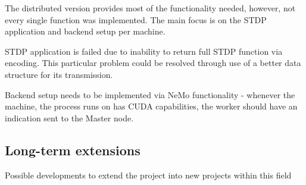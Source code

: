 The distributed version provides most of the functionality needed, however, not every single function was implemented. The main focus is on the STDP application and backend setup per machine.

STDP application is failed due to inability to return full STDP function via encoding. This particular problem could be resolved through use of a better data structure for its transmission.

Backend setup needs to be implemented via NeMo functionality - whenever the machine, the process runs on has CUDA capabilities, the worker should have an indication sent to the Master node.

\subsection{Long-term extensions}

Possible developments to extend the project into new projects within this field
